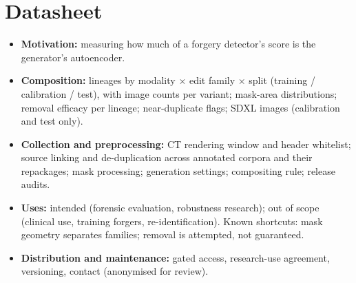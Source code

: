 
\clearpage
\setcounter{page}{1}
\maketitlesupplementary

\section{Datasheet}
\label{sec:supp:datasheet}
\begin{itemize}[leftmargin=*,itemsep=1pt]
\item \textbf{Motivation:} measuring how much of a forgery detector's score is the generator's autoencoder.
\item \textbf{Composition:} lineages by modality $\times$ edit family $\times$ split (training / calibration / test), with image counts per variant; mask-area distributions; removal efficacy per lineage; near-duplicate flags; SDXL images (calibration and test only).
\item \textbf{Collection and preprocessing:} CT rendering window and header whitelist; source linking and de-duplication across annotated corpora and their repackages; mask processing; generation settings; compositing rule; release audits.
\item \textbf{Uses:} intended (forensic evaluation, robustness research); out of scope (clinical use, training forgers, re-identification). Known shortcuts: mask geometry separates families; removal is attempted, not guaranteed.
\item \textbf{Distribution and maintenance:} gated access, research-use agreement, versioning, contact (anonymised for review).
\end{itemize}

